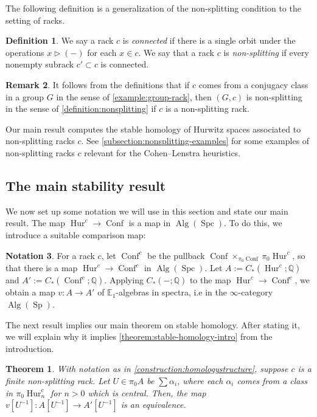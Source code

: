 \documentclass[12 pt]{amsart}
\theoremstyle{plain}
\newtheorem{theorem}[subsubsection]{Theorem}
\theoremstyle{definition}
\newtheorem{definition}[theorem]{Definition}
\newtheorem{remark}[theorem]{Remark}
\newtheorem{notation}[theorem]{Notation}
\theoremstyle{remark}
\numberwithin{equation}{section}
\DeclareMathOperator\Alg{Alg}
\DeclareMathOperator\Sp{Sp}
\DeclareMathOperator\Spc{Spc}
\DeclareMathOperator\Hur{Hur}
\DeclareMathOperator\Conf{Conf}
\newcommand\QQ{\mathbb{Q}}
\newcommand\NN{\mathbb{N}}
\newcommand\EE{\mathbb{E}}
\begin{document}
The following definition is a generalization of the non-splitting condition 
to the setting of racks.
\begin{definition}\label{defn:nonsplitting}
	We say a rack $c$ is \textit{connected} if there is a single orbit under the operations $x\triangleright(-)$ for each $x \in c$.
	We say that a rack $c$ is \textit{non-splitting} if every nonempty subrack $c' \subset c$ is connected.
\end{definition}

\begin{remark}
	\label{remark:}
	It follows from the definitions that
	if $c$ comes from a conjugacy class in a group $G$ in the sense of
	\autoref{example:group-rack}, then $(G,c)$ is
non-splitting in the sense of \autoref{definition:nonsplitting} if $c$ is
a non-splitting rack.
\end{remark}

Our main result computes the stable homology of Hurwitz spaces associated
to non-splitting racks $c$.
See \autoref{subsection:nonsplitting-examples} for some examples of
non-splitting racks $c$ relevant
for the Cohen--Lenstra heuristics.

\subsection{The main stability result}
\label{subsection:main-stability}
We now set up some notation we will use in this section and state our main
result.
The map $\Hur^{c} \to \Conf$ is a map in $\Alg(\Spc)$.
To do this, we introduce a suitable comparison map:

\begin{notation}\label{construction:homologystructure}
	For a rack $c$, let $\Conf^{c}$ be the pullback $\Conf\times_{\pi_0\Conf}\pi_0\Hur^{c}$, 
	so that there is a map $\Hur^{c} \to \Conf^{c}$ in $\Alg(\Spc)$. %
	Let $A:=C_*(\Hur^{c};\QQ)$ and $A':=C_*(\Conf^{c};\QQ)$.
	Applying $C_*(-;\QQ)$ to the map $\Hur^{c} \to \Conf^{c}$,
	we obtain a map $v: A \to A'$ of $\EE_1$-algebras %
	in spectra, i.e in the $\infty$-category $\Alg(\Sp)$.
\end{notation}
The next result implies our main theorem on stable homology. After stating it,
we will explain why it implies \autoref{theorem:stable-homology-intro} from the
introduction. 
\begin{theorem}\label{theorem:mainhom}
	With notation as in \autoref{construction:homologystructure},
	suppose $c$ is a finite non-splitting rack.
	Let $U \in \pi_0A$ be $\sum \alpha_i$, where each $\alpha_i$ comes from a class in $\pi_0\Hur_n^c$ for $n>0$ which is central.
	Then, the map $v[U^{-1}]: A[U^{-1}] \to A'[U^{-1}]$ is an equivalence.
\end{theorem}
\end{document}
